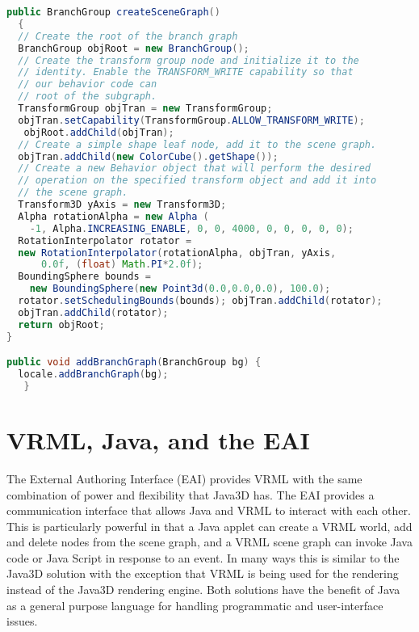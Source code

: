 \begin{lstlisting}[language=Java, caption={}, numbers=none, frame=none]
public BranchGroup createSceneGraph()
  {
  // Create the root of the branch graph
  BranchGroup objRoot = new BranchGroup();
  // Create the transform group node and initialize it to the
  // identity. Enable the TRANSFORM_WRITE capability so that
  // our behavior code can
  // root of the subgraph.
  TransformGroup objTran = new TransformGroup;
  objTran.setCapability(TransformGroup.ALLOW_TRANSFORM_WRITE);
   objRoot.addChild(objTran);
  // Create a simple shape leaf node, add it to the scene graph.
  objTran.addChild(new ColorCube().getShape());
  // Create a new Behavior object that will perform the desired
  // operation on the specified transform object and add it into
  // the scene graph.
  Transform3D yAxis = new Transform3D;
  Alpha rotationAlpha = new Alpha (
    -1, Alpha.INCREASING_ENABLE, 0, 0, 4000, 0, 0, 0, 0, 0);
  RotationInterpolator rotator =
  new RotationInterpolator(rotationAlpha, objTran, yAxis,
      0.0f, (float) Math.PI*2.0f);
  BoundingSphere bounds =
    new BoundingSphere(new Point3d(0.0,0.0,0.0), 100.0);
  rotator.setSchedulingBounds(bounds); objTran.addChild(rotator);
  objTran.addChild(rotator);
  return objRoot;
}

public void addBranchGraph(BranchGroup bg) {
  locale.addBranchGraph(bg);
   }
\end{lstlisting}

\section{VRML, Java, and the EAI}

The External Authoring Interface (EAI) provides VRML with the same combination of power and flexibility that Java3D has. The EAI provides a communication interface that allows Java and VRML to interact with each other. This is particularly powerful in that a Java applet can create a VRML world, add and delete nodes from the scene graph, and a VRML scene graph can invoke Java code or Java Script in response to an event. In many ways this is similar to the Java3D solution with the exception that VRML is being used for the rendering instead of the Java3D rendering engine. Both solutions have the benefit of Java as a general purpose language for handling programmatic and user-interface issues.

